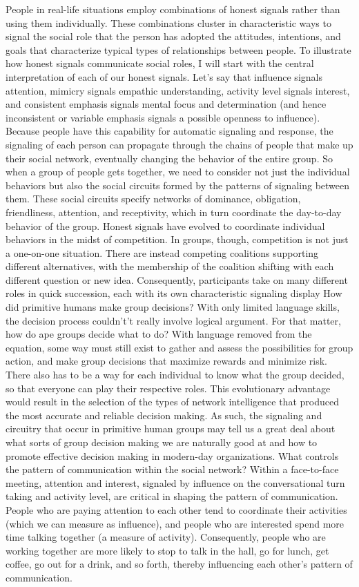 \documentclass[AER]{AEA}
\begin{document}
People in real-life situations employ combinations of honest signals rather than using them individually. These combinations cluster in characteristic ways to signal the social role that the person has adopted the attitudes, intentions, and goals that characterize typical types of 
relationships between people. To illustrate how honest signals communicate social roles, I will 
start with the central interpretation of each of our honest signals. Let’s say that influence signals attention, mimicry signals empathic understanding, activity level signals interest, and consistent emphasis signals mental focus and determination (and hence inconsistent or variable emphasis signals a possible openness to influence). 
Because people have this capability for automatic signaling and response, the signaling of each person can propagate through the chains of people that make up their social network, eventually 
changing the behavior of the entire group. So when a group of people gets together, we need to consider not just the individual behaviors but also the social circuits formed by the patterns of 
signaling between them. These social circuits specify networks of dominance, obligation, friendliness, attention, and receptivity, which in turn coordinate the day-to-day behavior of the
group. 
Honest signals have evolved to coordinate individual behaviors in the midst of competition. In groups, though, competition is not just a one-on-one situation. There are instead competing coalitions supporting different alternatives, with the membership of the coalition shifting with each different question or new idea. Consequently, participants take on many different roles in quick succession, each with its own characteristic signaling display
How did primitive humans make group decisions? With only limited language skills, the decision process couldn't’t really involve logical argument. For that matter, how do ape groups decide what 
to do? With language removed from the equation, some way must still exist to gather and assess the possibilities for group action, and make group decisions that maximize rewards and minimize risk. 
There also has to be a way for each individual to know what the group decided, so that everyone can play their respective roles. This evolutionary advantage would result in the selection of the 
types of network intelligence that produced the most accurate and reliable decision making. As such, the signaling and circuitry that occur in primitive human groups may tell us a great deal about 
what sorts of group decision making we are naturally good at and how to promote effective decision making in modern-day organizations. 
What controls the pattern of communication within the social network? Within a face-to-face meeting, attention and interest, signaled by influence on the conversational turn taking and activity 
level, are critical in shaping the pattern of communication. People who are paying attention to each other tend to coordinate their activities (which we can measure as influence), and people who are interested spend more time talking together (a measure of activity). Consequently, people who are working together are more likely to stop to talk in the hall, go for lunch, get coffee, go out for 
a drink, and so forth, thereby influencing each other’s pattern of communication. 
\end{document}
